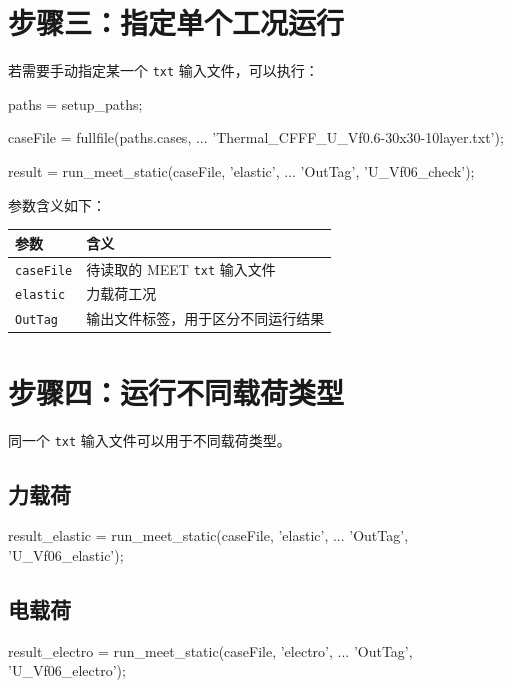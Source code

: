 \documentclass[UTF8,fontset=windows]{ctexart}
\begin{document}
\section{步骤三：指定单个工况运行}

若需要手动指定某一个 \texttt{txt} 输入文件，可以执行：

\begin{code}
paths = setup_paths;

caseFile = fullfile(paths.cases, ...
    'Thermal_CFFF_U_Vf0.6-30x30-10layer.txt');

result = run_meet_static(caseFile, 'elastic', ...
    'OutTag', 'U_Vf06_check');
\end{code}

参数含义如下：

\begin{table}[h]
\centering
\begin{tabular}{ll}
\toprule
参数 & 含义 \\
\midrule
\texttt{caseFile} & 待读取的 MEET \texttt{txt} 输入文件 \\
\texttt{elastic} & 力载荷工况 \\
\texttt{OutTag} & 输出文件标签，用于区分不同运行结果 \\
\bottomrule
\end{tabular}
\end{table}

\section{步骤四：运行不同载荷类型}

同一个 \texttt{txt} 输入文件可以用于不同载荷类型。

\subsection{力载荷}

\begin{code}
result_elastic = run_meet_static(caseFile, 'elastic', ...
    'OutTag', 'U_Vf06_elastic');
\end{code}

\subsection{电载荷}

\begin{code}
result_electro = run_meet_static(caseFile, 'electro', ...
    'OutTag', 'U_Vf06_electro');
\end{code}
\end{document}
